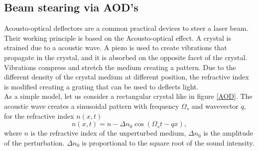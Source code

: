 \subsection{Beam stearing via AOD's}
\label{theory_AOD}
Acousto-optical deflectors are a common practical devices to steer a laser beam. Their working principle is based on the Acousto-optical effect. A crystal is strained due to a acoustic wave. A piezo is used to create vibrations that propagate in the crystal, and it is absorbed on the opposite facet of the crystal. Vibrations compress and stretch the medium creating a pattern. Due to the different density of the crystal medium at different position, the refractive index is modified creating a grating that can be used to deflects light.\\
As a simple model, let us consider a rectangular crystal like in figure \ref{AOD}. The acoustic wave creates a sinusoidal pattern with frequency $\Omega_s$ and wavevector $q$, for the refractive index $n(x,t)$
\begin{equation}
n(x,t) = n - \Delta n_0 \cos \left(\Omega_s t - qx \right),
\end{equation}
where $n$ is the refractive index of the unperturbed medium, $\Delta n_0$ is the amplitude of the perturbation. $\Delta n_0$ is proportional to the square root of the sound intensity.

